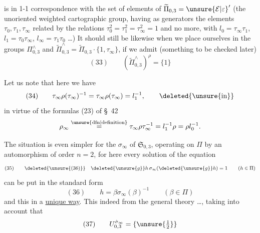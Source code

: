 
is in 1-1 correspondence with the set of elements of $\widetilde\Pi_{0,3}=\unsure{\mathcal E|\varepsilon}'$ (the unoriented weighted  cartographic group, having as generators the elements $\tau_0,\tau_1,\tau_\infty$ related by the relations $\tau_0^2=\tau_1^2=\tau_\infty^2=1$ and no more, with $l_0=\tau_\infty\tau_1$, $l_1=\tau_0\tau_\infty$, $l_\infty=\tau_1\tau_0$ \dots)
It should still be likewise when we place ourselves in the groups $\Pi_{0,3}^{\wedge}$ and $\widetilde\Pi_{0,3}^{\wedge}=\widetilde\Pi_{0,3}\cdot\{1,\tau_\infty\}$, if we admit (something to be checked later)
\[
(33)\qquad(\widetilde\Pi_{0,3}^{\wedge})^\rho=\{1\}
\]

Let us note that here we have
\[
(34)\qquad\tau_\infty\rho(\tau_\infty)^{-1}
=\tau_\infty\rho(\tau_\infty)=l_1^{-1},
\qquad\deleted{\unsure{\text{in}}}
\]
in virtue of the formulas (23) of \S\ 42
\[
\rho_\infty\overset{\unsure{\mathrm{dfn}|\text{definition}}}{=}
\tau_\infty\rho\tau_\infty^{-1}
=l_1^{-1}\rho=\rho l_0^{-1}.
\]

The situation is even simpler for the  $\sigma_\infty$ of $\mathfrak S_{0,3}$, operating on $\Pi$ by an automorphism of order $n=2$, for here every solution of the  equation
\[
(35)\qquad\deleted{\unsure{(36)}}\quad
\deleted{\unsure{g}}h\,\sigma_\infty(\deleted{\unsure{g}}h)=1
\qquad(h\in\Pi)
\]
can be put in the standard form
\[
(36)\qquad h=\beta\sigma_\infty(\beta)^{-1}
\qquad(\beta\in\Pi)
\]
and this in a \uline{unique way}. This  indeed from the general theory \dots, taking into account that
\[
(37)\qquad U_{0,3}^{\dot\sigma_\infty}=\{\unsure{\tfrac12}\}
\]